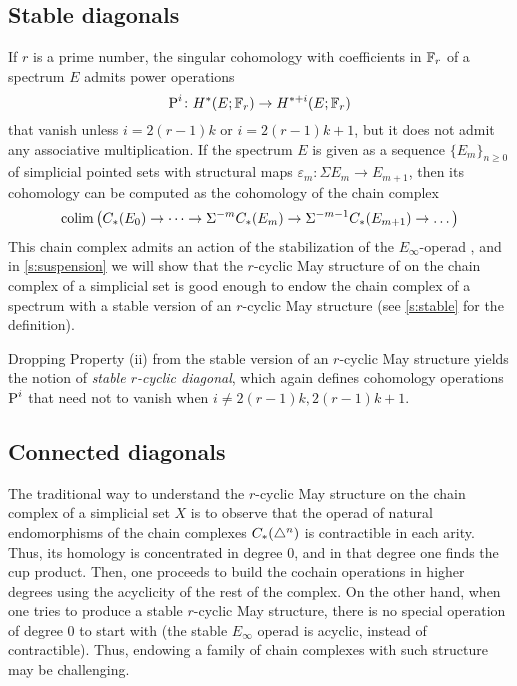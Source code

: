 \subsection{Stable diagonals}

If $r$ is a prime number, the singular cohomology with coefficients in $\mathbb{F}_r$ of a spectrum $E$ admits power operations
\[
\operatorname{P}^i \colon H^*(E;\mathbb{F}_r) \to H^{*+i}(E;\mathbb{F}_r)
\]
that vanish unless $i = 2(r-1)k$ or $i = 2(r-1)k+1$, but it does not admit any associative multiplication.
If the spectrum $E$ is given as a sequence $\{E_m\}_{n \geq 0}$ of simplicial pointed sets with structural maps $\varepsilon_m \colon \Sigma E_m \to E_{m+1}$, then its cohomology can be computed as the cohomology of the chain complex
\[
\operatorname*{colim} \left(C_{*}(E_0) \to \dots \to \Sigma^{-m}C_{*}(E_m) \to \Sigma^{-m-1} C_{*}(E_{m+1}) \to \dots\right)
\]
This chain complex admits an action of the stabilization of the $E_{\infty}$-operad \cite{Gill2020}, and in \cref{s:suspension} we will show that the $r$-cyclic May structure of \cite{medina2021may_st} on the chain complex of a simplicial set is good enough to endow the chain complex of a spectrum with a stable version of an $r$-cyclic May structure (see \cref{s:stable} for the definition).

Dropping Property (ii) from the stable version of an $r$-cyclic May structure yields the notion of \emph{stable $r$-cyclic diagonal}, which again defines cohomology operations $\operatorname{P}^i$ that need not to vanish when $i \neq 2(r-1)k, 2(r-1)k+1$.

\subsection{Connected diagonals}

The traditional way to understand the $r$-cyclic May structure on the chain complex of a simplicial set $X$ is to observe that the operad of natural endomorphisms of the chain complexes $C_{*}(\triangle^n)$ is contractible in each arity.
Thus, its homology is concentrated in degree $0$, and in that degree one finds the cup product.
Then, one proceeds to build the cochain operations in higher degrees using the acyclicity of the rest of the complex.
On the other hand, when one tries to produce a stable $r$-cyclic May structure, there is no special operation of degree $0$ to start with (the stable $E_{\infty}$ operad is acyclic, instead of contractible).
Thus, endowing a family of chain complexes with such structure may be challenging.


